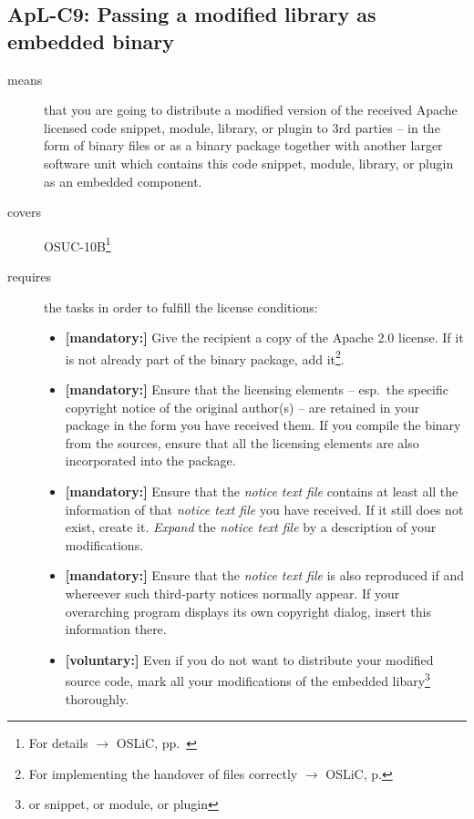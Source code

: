 \subsection{ApL-C9: Passing a modified library as embedded binary}
\label{OSUC-10B-Apache20}
\begin{description}
\item[means] that you are going to distribute a modified version of the received
Apache licensed code snippet, module, library, or plugin to 3rd parties -- in
the form of binary files or as a binary package together with another larger
software unit which contains this code snippet, module, library, or plugin as an
embedded component.
\item[covers] OSUC-10B\footnote{For details $\rightarrow$ OSLiC, pp.\
\pageref{OSUC-10B-DEF}}
\item[requires] the tasks in order to fulfill the license conditions:
\begin{itemize}
  
  \item \textbf{[mandatory:]} Give the recipient a copy of the Apache 2.0
  license. If it is not already part of the binary package, add
  it\footnote{For implementing the handover of files correctly $\rightarrow$
  OSLiC, p. \pageref{DistributingFilesHint}}.
  
  \item \textbf{[mandatory:]} Ensure that the licensing elements -- esp.\ the
  specific copyright notice of the original author(s) -- are retained in your
  package in the form you have received them. If you compile the binary from the
  sources, ensure that all the licensing elements are also incorporated into the
  package.
  
  \item \textbf{[mandatory:]} Ensure that the \emph{notice text file} contains
  at least all the information of that \emph{notice text file} you have
  received.  If it still does not exist, create it. \emph{Expand} the
  \emph{notice text file} by a description of your modifications.
 
  \item \textbf{[mandatory:]} Ensure that the \emph{notice text file} is also
  reproduced if and whereever such third-party notices normally appear. If your
  overarching program displays its own copyright dialog, insert this information
  there.
     
  \item \textbf{[voluntary:]} Even if you do not want to distribute your
  modified source code, mark all your modifications of the embedded
  libary\footnote{or snippet, or module, or plugin} thoroughly.
 

\end{itemize}
\end{description}
